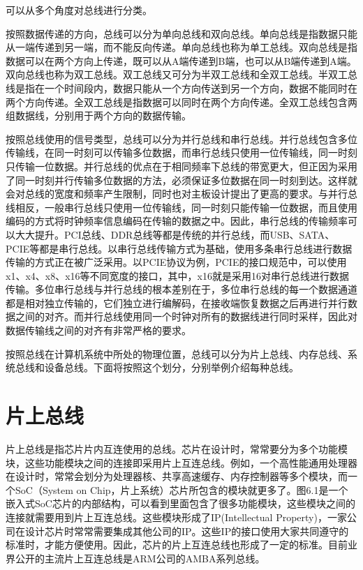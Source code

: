 \documentclass[]{ctexbook}
\begin{document}
可以从多个角度对总线进行分类。

按照数据传递的方向，总线可以分为单向总线和双向总线。单向总线是指数据只能从一端传递到另一端，而不能反向传递。单向总线也称为单工总线。双向总线是指数据可以在两个方向上传递，既可以从A端传递到B端，也可以从B端传递到A端。双向总线也称为双工总线。双工总线又可分为半双工总线和全双工总线。半双工总线是指在一个时间段内，数据只能从一个方向传送到另一个方向，数据不能同时在两个方向传递。全双工总线是指数据可以同时在两个方向传递。全双工总线包含两组数据线，分别用于两个方向的数据传输。

按照总线使用的信号类型，总线可以分为并行总线和串行总线。并行总线包含多位传输线，在同一时刻可以传输多位数据，而串行总线只使用一位传输线，同一时刻只传输一位数据。并行总线的优点在于相同频率下总线的带宽更大，但正因为采用了同一时刻并行传输多位数据的方法，必须保证多位数据在同一时刻到达。这样就会对总线的宽度和频率产生限制，同时也对主板设计提出了更高的要求。与并行总线相反，一般串行总线只使用一位传输线，同一时刻只能传输一位数据，而且使用编码的方式将时钟频率信息编码在传输的数据之中。因此，串行总线的传输频率可以大大提升。PCI总线、DDR总线等都是传统的并行总线，而USB、SATA、PCIE等都是串行总线。以串行总线传输方式为基础，使用多条串行总线进行数据传输的方式正在被广泛采用。以PCIE协议为例，PCIE的接口规范中，可以使用x1、x4、x8、x16等不同宽度的接口，其中，x16就是采用16对串行总线进行数据传输。多位串行总线与并行总线的根本差别在于，多位串行总线的每一个数据通道都是相对独立传输的，它们独立进行编解码，在接收端恢复数据之后再进行并行数据之间的对齐。而并行总线使用同一个时钟对所有的数据线进行同时采样，因此对数据传输线之间的对齐有非常严格的要求。

按照总线在计算机系统中所处的物理位置，总线可以分为片上总线、内存总线、系统总线和设备总线。下面将按照这个划分，分别举例介绍每种总线。

\hypertarget{ux7247ux4e0aux603bux7ebf}{%
\section{片上总线}\label{ux7247ux4e0aux603bux7ebf}}

片上总线是指芯片片内互连使用的总线。芯片在设计时，常常要分为多个功能模块，这些功能模块之间的连接即采用片上互连总线。例如，一个高性能通用处理器在设计时，常常会划分为处理器核、共享高速缓存、内存控制器等多个模块，而一个SoC（System on Chip，片上系统）芯片所包含的模块就更多了。图6.1是一个嵌入式SoC芯片的内部结构，可以看到里面包含了很多功能模块，这些模块之间的连接就需要用到片上互连总线。这些模块形成了IP(Intellectual Property)，一家公司在设计芯片时常常需要集成其他公司的IP。这些IP的接口使用大家共同遵守的标准时，才能方便使用。因此，芯片的片上互连总线也形成了一定的标准。目前业界公开的主流片上互连总线是ARM公司的AMBA系列总线。
\end{document}

